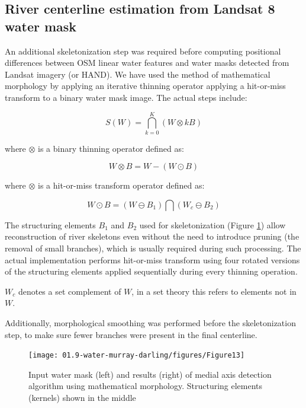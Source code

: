 \subsection{River centerline estimation from Landsat 8 water mask}
An additional skeletonization step was required before computing positional differences between OSM linear water features and water masks detected from Landsat imagery (or HAND). We have used the method of mathematical morphology \citet{Serra1982} by applying an iterative thinning operator applying a hit-or-miss transform to a binary water mask image. The actual steps include:

\begin{equation}
S(W)=\bigcap_{k=0}^K \left(W \otimes kB \right)
\end{equation}

where $\otimes$ is a binary thinning operator defined as:

\begin{equation}
W \otimes B = W - \left( W \odot B \right)
\end{equation}

where $\otimes$ is a hit-or-miss transform operator defined as:

\begin{equation}
W \odot B = \left( W \ominus B_1 \right) \bigcap \left( W_c \ominus B_2 \right)
\end{equation}

The structuring elements $B_1$ and $B_2$ used for skeletonization (Figure \ref{fig:au-skeleton}) allow reconstruction of river skeletons even without the need to introduce pruning (the removal of small branches), which is usually required during such processing. The actual implementation performs hit-or-miss transform using four rotated versions of the structuring elements applied sequentially during every thinning operation.

$W_c$ denotes a set complement of $W$, in a set theory this refers to elements not in $W$. 

Additionally, morphological smoothing was performed before the skeletonization step, to make sure fewer branches were present in the final centerline.

\begin{figure}
	\centering
	\texttt{[image: 01.9-water-murray-darling/figures/Figure13]}
	\caption{Input water mask (left) and results (right) of medial axis detection algorithm using mathematical morphology. Structuring elements (kernels) shown in the middle}
	\label{fig:au-skeleton}
\end{figure}

